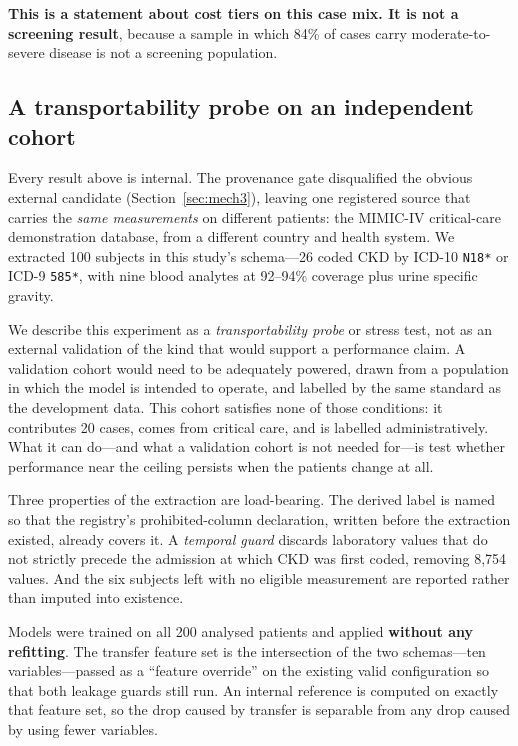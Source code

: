 \documentclass[conference]{IEEEtran}
\begin{document}
\textbf{This is a statement about cost tiers on this case mix. It is not a
screening result}, because a sample in which 84\% of cases carry
moderate-to-severe disease is not a screening population.

\subsection{A transportability probe on an independent cohort}
\label{sec:external}

Every result above is internal. The provenance gate disqualified the obvious
external candidate (Section~\ref{sec:mech3}), leaving one registered source
that carries the \emph{same measurements} on different patients: the MIMIC-IV
critical-care demonstration database, from a different country and health
system. We extracted 100 subjects in this study's schema---26 coded CKD by
ICD-10 \texttt{N18*} or ICD-9 \texttt{585*}, with nine blood analytes at
92--94\% coverage plus urine specific gravity.

We describe this experiment as a \emph{transportability probe} or stress
test, not as an external validation of the kind that would support a
performance claim. A validation cohort would need to be adequately powered,
drawn from a population in which the model is intended to operate, and
labelled by the same standard as the development data. This cohort satisfies
none of those conditions: it contributes 20 cases, comes from critical care,
and is labelled administratively. What it can do---and what a validation
cohort is not needed for---is test whether performance near the ceiling
persists when the patients change at all.

Three properties of the extraction are load-bearing. The derived label is
named so that the registry's prohibited-column declaration, written before
the extraction existed, already covers it. A \emph{temporal guard} discards
laboratory values that do not strictly precede the admission at which CKD was
first coded, removing 8{,}754 values. And the six subjects left with no
eligible measurement are reported rather than imputed into existence.

Models were trained on all 200 analysed patients and applied \textbf{without
any refitting}. The transfer feature set is the intersection of the two
schemas---ten variables---passed as a ``feature override'' on the existing
valid configuration so that both leakage guards still run. An internal
reference is computed on exactly that feature set, so the drop caused by
transfer is separable from any drop caused by using fewer variables.
\end{document}
